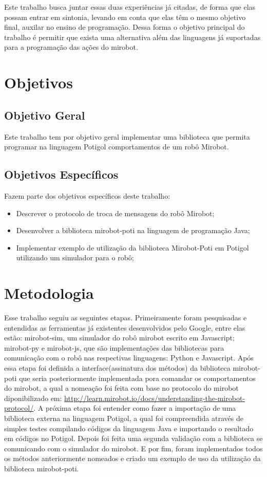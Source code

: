 Este trabalho busca juntar essas duas experiências já citadas, de forma que
elas possam entrar em sintonia, levando em
conta que elas têm o mesmo objetivo final, auxilar no ensino de programação. 
Dessa forma o objetivo principal do
trabalho é permitir que exista uma alternativa além das linguagens já
suportadas para a programação das ações do mirobot.

\section{Objetivos}

\subsection{Objetivo Geral}

Este trabalho tem por objetivo geral implementar uma biblioteca que permita
programar na linguagem Potigol comportamentos de um robô Mirobot.

\subsection{Objetivos Específicos}

Fazem parte dos objetivos específicos deste trabalho:

\begin{itemize}
  \item Descrever o protocolo de troca de mensagens do robô Mirobot;
  \item Desenvolver a biblioteca mirobot-poti na linguagem de
    programação Java;
  \item Implementar exemplo de utilização da biblioteca
      Mirobot-Poti em Potigol utilizando um simulador para o robô;
\end{itemize}


\section{Metodologia}

Esse trabalho seguiu as seguintes etapas. Primeiramente foram pesquisadas e
entendidas as ferramentas já existentes desenvolvidos pelo Google, entre elas estão:
mirobot-sim, um simulador do robô mirobot escrito em Javascript; mirobot-py e
mirobot-js, que são implementações das bibliotecas para comunicação com o robô
nas respectivas linguagens: Python e Javascript. 
Após essa etapa foi
definida a interface(assinatura dos métodos) da biblioteca mirobot-poti que seria
posteriormente implementada pora comandar os
comportamentos do mirobot, a qual a nomeação foi feita com base no protocolo do mirobot diponibilizado em: \url{http://learn.mirobot.io/docs/understanding-the-mirobot-protocol/}.
A próxima etapa foi entender como fazer a
importação de uma biblioteca externa na linguagem Potigol, a qual foi
compreendida através de simples testes compilando códigos da linguagem Java e
importando o resultado em códigos no Potigol. 
Depois foi feita uma
segunda validação com a biblioteca se comunicando com o simulador do mirobot. 
E por fim, foram implementados todos os métodos anteriormente
nomeados e criado um exemplo de uso da utilização da biblioteca mirobot-poti.

